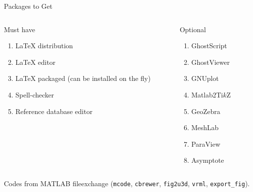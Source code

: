 \documentclass[xcolor=dvipsnames, aspectratio=169, handout, intlimits]{beamer}
\begin{document}
\begin{frame}{Packages to Get}

\vspace{-0.5cm}
\begin{columns}[t]
	\begin{column}{0.475\textwidth}
		\begin{block}{Must have}
	\begin{enumerate}
		\item \LaTeX{} distribution \href{http://miktex.org/download}{}
		\item \LaTeX{} editor \href{http://www.texstudio.org/}{}
		\item \LaTeX{} packaged (can be installed on the fly)
		\item Spell-checker \href{http://www.rohitfarmer.in/computing/linux-and-open-source/how-to-make-dictionary-work-in-texstudio/}{}
		\item Reference database editor \href{http://www.jabref.org/}{}											
	\end{enumerate}
		\end{block}
	\end{column}
	\begin{column}{0.475\textwidth}
		\begin{block}{Optional}
	\begin{enumerate}	
		\item GhostScript \href{http://www.ghostscript.com/download/}{}
		\item GhostViewer \href{http://pages.cs.wisc.edu/~ghost/gsview/}{}
		\item GNUplot \href{http://www.gnuplot.info/download.html}{}
		\item Matlab2Ti$k$Z \href{https://www.mathworks.com/matlabcentral/fileexchange/22022-matlab2tikz-matlab2tikz}{}
		\item GeoZebra \href{https://www.geogebra.org/}{}
		\item MeshLab \href{http://www.meshlab.net/}{}
		\item ParaView \href{https://www.paraview.org/}{}
		\item Asymptote \href{http://asymptote.sourceforge.net/}{}
	\end{enumerate}
		\end{block}
	\end{column}
\end{columns}

\vspace{0.25cm}
Codes from MATLAB fileexchange (\texttt{mcode}, \texttt{cbrewer}, \texttt{fig2u3d}, \texttt{vrml}, \texttt{export\_fig}).

\end{frame}
\end{document}
